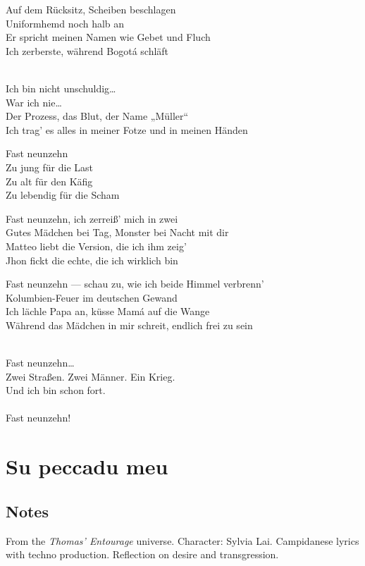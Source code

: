 \begin{lyrics}
Auf dem Rücksitz, Scheiben beschlagen\\
Uniformhemd noch halb an\\
Er spricht meinen Namen wie Gebet und Fluch\\
Ich zerberste, während Bogotá schläft

\\
Ich bin nicht unschuldig…\\
War ich nie…\\
Der Prozess, das Blut, der Name „Müller“\\
Ich trag’ es alles in meiner Fotze und in meinen Händen

Fast neunzehn\\
Zu jung für die Last\\
Zu alt für den Käfig\\
Zu lebendig für die Scham

Fast neunzehn, ich zerreiß’ mich in zwei\\
Gutes Mädchen bei Tag, Monster bei Nacht mit dir\\
Matteo liebt die Version, die ich ihm zeig’\\
Jhon fickt die echte, die ich wirklich bin

Fast neunzehn — schau zu, wie ich beide Himmel verbrenn’\\
Kolumbien-Feuer im deutschen Gewand\\
Ich lächle Papa an, küsse Mamá auf die Wange\\
Während das Mädchen in mir schreit, endlich frei zu sein

\\
Fast neunzehn…\\
Zwei Straßen. Zwei Männer. Ein Krieg.\\
Und ich bin schon fort.\\
\\
Fast neunzehn!

\end{lyrics}

\section{Su peccadu meu}

\subsection{Notes}
From the \emph{Thomas' Entourage} universe.
Character: Sylvia Lai.
Campidanese lyrics with techno production. Reflection on desire and transgression.


